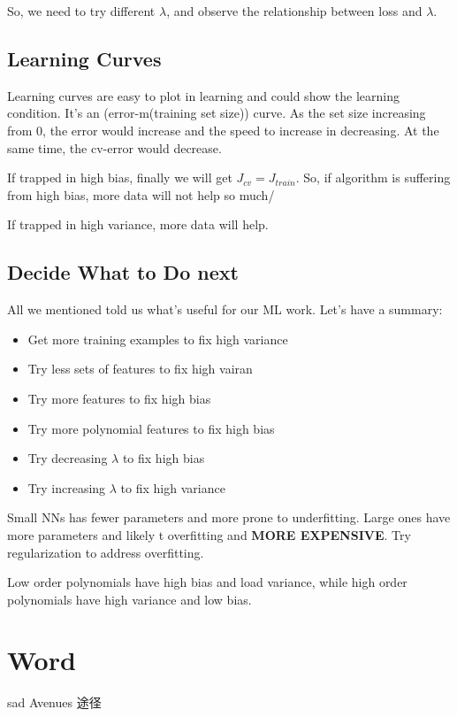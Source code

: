 \documentclass[en,11pt,english,black,simple]{../elegantbook}
\begin{document}
So, we need to try different \(\lambda\), and observe the relationship between loss and \(\lambda\). 

\subsection{Learning Curves}

Learning curves are easy to plot in learning and could show the learning condition. It's an (error-m(training set size)) curve. As the set size increasing from 0, the error would increase and the speed to increase in decreasing. At the same time, the cv-error would decrease.

If trapped in high bias, finally we will get \(J_{cv} = J_{train}\). So, if algorithm is suffering from high bias, more data will not help so much/ 

If trapped in high variance, more data will help.

\subsection{Decide What to Do next}

All we mentioned told us what's useful for our ML work. Let's have a summary:

\begin{itemize}
    \item Get more training examples to fix high variance
    \item Try less sets of features to fix high vairan  
    \item Try more features to fix high bias 
    \item Try more polynomial features to fix high bias 
    \item Try decreasing \(\lambda\) to fix high bias 
    \item Try increasing \(\lambda\) to fix high variance 
\end{itemize}

Small NNs has fewer parameters and more prone to underfitting. Large ones have more parameters and likely t overfitting and \textbf{MORE EXPENSIVE}. Try regularization to address overfitting.

Low order polynomials have high bias and load variance, while high order polynomials have high variance and low bias. 

\section*{Word}
sad
Avenues 途径

\let\chapname\undefined
\ifx\mainclass\undefined
\end{document}
